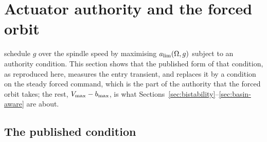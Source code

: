 \section{Actuator authority and the forced orbit}\label{sec:feasibility}

\citet{ozsoy2026robust} schedule $g$ over the spindle speed by maximising $a_{\lim}(\Omega,g)$ subject to an authority condition. This section shows that the published form of that condition, as reproduced here, measures the entry transient, and replaces it by a condition on the steady forced command, which is the part of the authority that the forced orbit takes; the rest, $V_{\max}-b_{\max}$, is what Sections~\ref{sec:bistability}--\ref{sec:basin-aware} are about.

\subsection{The published condition}\label{sec:feas-pub}

